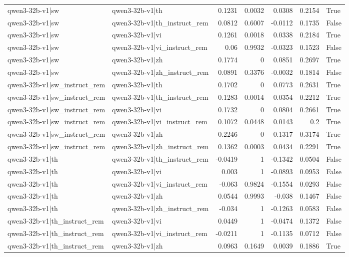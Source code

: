 \begin{table}
\begin{tabular}{l l r r r r l}
qwen3-32b-v1|sw & qwen3-32b-v1|th & 0.1231 & 0.0032 & 0.0308 & 0.2154 & True \\
qwen3-32b-v1|sw & qwen3-32b-v1|th_instruct_rem & 0.0812 & 0.6007 & -0.0112 & 0.1735 & False \\
qwen3-32b-v1|sw & qwen3-32b-v1|vi & 0.1261 & 0.0018 & 0.0338 & 0.2184 & True \\
qwen3-32b-v1|sw & qwen3-32b-v1|vi_instruct_rem & 0.06 & 0.9932 & -0.0323 & 0.1523 & False \\
qwen3-32b-v1|sw & qwen3-32b-v1|zh & 0.1774 & 0 & 0.0851 & 0.2697 & True \\
qwen3-32b-v1|sw & qwen3-32b-v1|zh_instruct_rem & 0.0891 & 0.3376 & -0.0032 & 0.1814 & False \\
qwen3-32b-v1|sw_instruct_rem & qwen3-32b-v1|th & 0.1702 & 0 & 0.0773 & 0.2631 & True \\
qwen3-32b-v1|sw_instruct_rem & qwen3-32b-v1|th_instruct_rem & 0.1283 & 0.0014 & 0.0354 & 0.2212 & True \\
qwen3-32b-v1|sw_instruct_rem & qwen3-32b-v1|vi & 0.1732 & 0 & 0.0804 & 0.2661 & True \\
qwen3-32b-v1|sw_instruct_rem & qwen3-32b-v1|vi_instruct_rem & 0.1072 & 0.0448 & 0.0143 & 0.2 & True \\
qwen3-32b-v1|sw_instruct_rem & qwen3-32b-v1|zh & 0.2246 & 0 & 0.1317 & 0.3174 & True \\
qwen3-32b-v1|sw_instruct_rem & qwen3-32b-v1|zh_instruct_rem & 0.1362 & 0.0003 & 0.0434 & 0.2291 & True \\
qwen3-32b-v1|th & qwen3-32b-v1|th_instruct_rem & -0.0419 & 1 & -0.1342 & 0.0504 & False \\
qwen3-32b-v1|th & qwen3-32b-v1|vi & 0.003 & 1 & -0.0893 & 0.0953 & False \\
qwen3-32b-v1|th & qwen3-32b-v1|vi_instruct_rem & -0.063 & 0.9824 & -0.1554 & 0.0293 & False \\
qwen3-32b-v1|th & qwen3-32b-v1|zh & 0.0544 & 0.9993 & -0.038 & 0.1467 & False \\
qwen3-32b-v1|th & qwen3-32b-v1|zh_instruct_rem & -0.034 & 1 & -0.1263 & 0.0583 & False \\
qwen3-32b-v1|th_instruct_rem & qwen3-32b-v1|vi & 0.0449 & 1 & -0.0474 & 0.1372 & False \\
qwen3-32b-v1|th_instruct_rem & qwen3-32b-v1|vi_instruct_rem & -0.0211 & 1 & -0.1135 & 0.0712 & False \\
qwen3-32b-v1|th_instruct_rem & qwen3-32b-v1|zh & 0.0963 & 0.1649 & 0.0039 & 0.1886 & True \\

\end{tabular}
\end{table}
